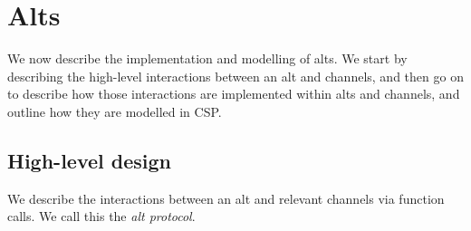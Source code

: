 \section{Alts}

\inlineScala

We now describe the implementation and modelling of alts.  We start by
describing the high-level interactions between an alt and channels, and then
go on to describe how those interactions are implemented within alts and
channels, and outline how they are modelled in CSP.


\subsection{High-level design}

We describe the interactions between an alt and relevant channels via function
calls.  We call this the \emph{alt protocol}. 

